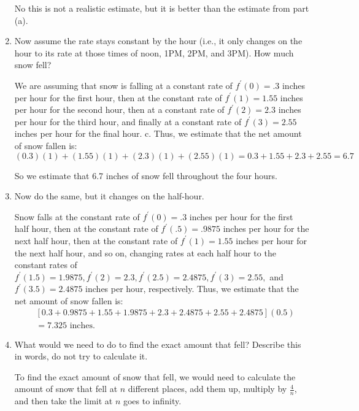 \documentclass[handout,nooutcomes]{ximera}
\begin{document}
\begin{problem}
\begin{enumerate}
\begin{freeResponse}
		   No this is not a realistic estimate, but it is better than the estimate from part (a).  
		\end{freeResponse}
		
		
		
	\item  Now assume the rate stays constant by the hour (i.e., it only changes on the hour to its rate at those times of noon, 1PM, 2PM, and 3PM).  How much snow fell?
		\begin{freeResponse}
		We are assuming that snow is falling at a constant rate of $f^\prime (0)=.3$ inches per hour for the first hour, then at the constant rate of $f^\prime (1)=1.55$ inches per hour for the second hour, then at a constant rate of $f^\prime (2)=2.3$ inches per hour for the third hour, and finally at a constant rate of $f^\prime (3)=2.55$ inches per hour for the final hour.  c. Thus, we estimate that the net amount of snow fallen is:
		$$ (0.3)(1) + (1.55)(1) + (2.3)(1) + (2.55)(1) = 0.3 + 1.55 + 2.3 + 2.55 = 6.7 $$
		
		So we estimate that 6.7 inches of snow fell throughout the four hours.
		\end{freeResponse}
		
		
		
	\item  Now do the same, but it changes on the half-hour.
		\begin{freeResponse}
		Snow falls at the constant rate of $f^\prime (0)=.3$ inches per hour for the first half hour, then at the constant rate of $f^\prime (.5)=.9875$ inches per hour for the next half hour, then at the constant rate of $f^\prime (1)=1.55$ inches per hour for the next half hour, and so on, changing rates at each half hour to the constant rates of $f^\prime (1.5)=1.9875, f^\prime (2)=2.3, f^\prime (2.5)=2.4875, f^\prime (3)=2.55, $ and $f^\prime (3.5)=2.4875$ inches per hour, respectively.  Thus, we estimate that the net amount of snow fallen is:
		\begin{align*}
		& [0.3 + 0.9875 + 1.55 + 1.9875 + 2.3 + 2.4875 + 2.55 + 2.4875](0.5) \\
		&= 7.325 \text{ inches}.
		\end{align*}
		\end{freeResponse}
		
		
		
	\item  What would we need to do to find the exact amount that fell?  Describe this in words, do not try to calculate it.
		\begin{freeResponse}
		To find the exact amount of snow that fell, we would need to calculate the amount of snow that fell at $n$ different places, add them up, multiply by $\frac{4}{n}$, and then take the limit at $n$ goes to infinity.
		\end{freeResponse}
		
		
		
	\end{enumerate}
		
		
\end{problem}
\end{document}
